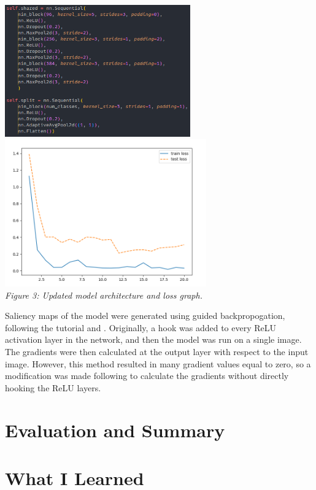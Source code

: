 \documentclass{article}[12pt]
\begin{document}
\begin{center}
    \includegraphics[width=0.6\textwidth]{images/final_model.png}\\
    \includegraphics[width=0.65\textwidth]{images/final_model_graph.png}\\
    \textit{Figure 3: Updated model architecture and loss graph.}
\end{center}

Saliency maps of the model were generated using guided backpropogation, following the tutorial \cite{saliency} and \cite{backprop}. Originally, a hook was added to every ReLU activation layer in the network, and then the model was run on a single image. The gradients were then calculated at the output layer with respect to the input image. However, this method resulted in many gradient values equal to zero, so a modification was made following \cite{saliency} to calculate the gradients without directly hooking the ReLU layers.\\

\section*{Evaluation and Summary}


\section*{What I Learned}
\end{document}
